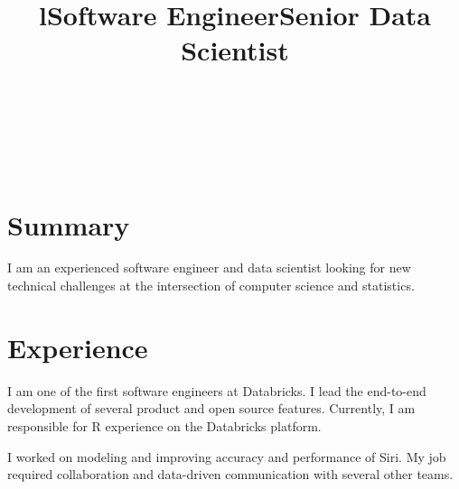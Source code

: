 \documentclass[margin]{res}
\begin{document}

\address{
1725 Liberty St., Apt 5\\
El Cerrito, CA 94530
}

\address{
Phone: 408-666-3793\\
Email: \href{mailto:falaki@gmail.com}{falaki@gmail.com}\\
Web: \href{http://www.falaki.net/}{www.falaki.net}
}


\begin{resume}

\begin{format}
\title{l}\\
\\
\body\\
\end{format}

\section{\sc \large Summary}
I am an experienced software engineer and data scientist looking for new technical challenges at the intersection of computer science and statistics.

\title{\bf Software Engineer}
\section{\sc \large Experience}
\begin{position}
I am one of the first software engineers at Databricks. I lead the end-to-end development of several product and open source features. Currently, I am responsible for R experience on the Databricks platform.
\end{position}

\vspace{-0.15cm}

\title{\bf Senior Data Scientist}
\begin{position}
I worked on modeling and improving accuracy and performance of Siri. My job required collaboration and data-driven communication with several other teams.
\end{position}

\vspace{-0.15cm}


\end{resume}
\end{document}
